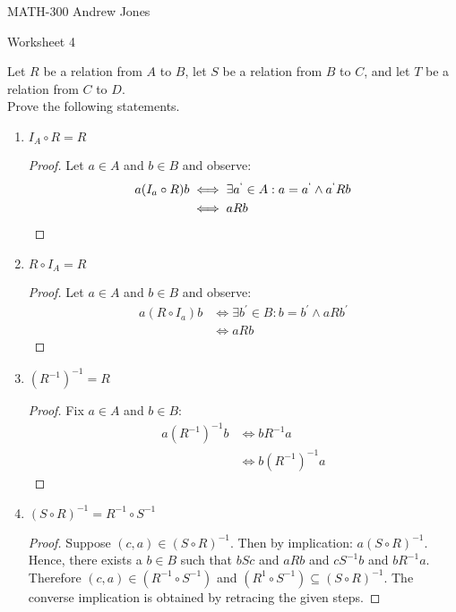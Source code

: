 \documentclass{article}
\begin{document}
    MATH-300 \hfill Andrew Jones
  \begin{center}
  {\huge Worksheet 4}
  \end{center}
  Let $R$ be a relation from $A$ to $B$, let $S$ be a relation from $B$ to $C$, and let $T$ be a relation from $C$ to $D$. \\ Prove the following statements. \\
  \begin{enumerate}
    \item $I_A \circ R = R$
      \begin{proof}
        Let $a\in A$ and $b\in B$ and observe:
        \begin{align*}
          a(I_a \circ R)b &\iff \exists a^`\in A: a = a^` \wedge a^`Rb \\
          &\iff aRb
        \end{align*}
      \end{proof}
    \item $R \circ I_A = R$
      \begin{proof}
        Let $a\in A$ and $b\in B$ and observe:
        \begin{align*}
          a(R \circ I_a)b &\iff \exists b^{'}\in B: b = b^{'} \wedge aRb^{'} \\
          &\iff aRb
        \end{align*}
      \end{proof}
    \item $(R^{-1})^{-1} = R$
      \begin{proof}
        Fix $a\in A$ and $b\in B$:
        \begin{align*}
          a(R^{-1})^{-1}b &\iff bR^{-1}a \\
          &\iff b(R^{-1})^{-1}a
        \end{align*}
      \end{proof}
    \item $(S \circ R)^{-1} = R^{-1}\circ S^{-1}$
      \begin{proof}
        Suppose $(c,a)\in (S \circ R)^{-1}$. Then by implication: $a (S \circ R)^{-1}$. Hence, there exists a $b \in B$ such that $bSc$ and $aRb$ and $cS^{-1}b$ and $bR^{-1}a$. Therefore $(c,a)\in (R^{-1} \circ S^{-1})$ and $(R^{1} \circ S^{-1}) \subseteq (S \circ R)^{-1}$. The converse implication is obtained by retracing the given steps.
      \end{proof}

\end{enumerate}
\end{document}
